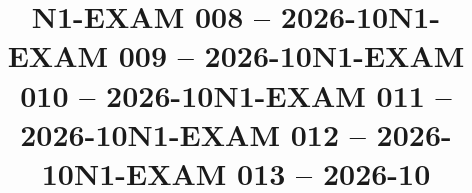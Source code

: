 \documentclass{ip-exam}
\begin{document}







\cleartoeven
\setcounter{questioncounter}{0}
\setcounter{page}{1}
\title{N1-EXAM 008 -- 2026-10}
\makeexamheader








\cleartoeven
\setcounter{questioncounter}{0}
\setcounter{page}{1}
\title{N1-EXAM 009 -- 2026-10}
\makeexamheader








\cleartoeven
\setcounter{questioncounter}{0}
\setcounter{page}{1}
\title{N1-EXAM 010 -- 2026-10}
\makeexamheader








\cleartoeven
\setcounter{questioncounter}{0}
\setcounter{page}{1}
\title{N1-EXAM 011 -- 2026-10}
\makeexamheader








\cleartoeven
\setcounter{questioncounter}{0}
\setcounter{page}{1}
\title{N1-EXAM 012 -- 2026-10}
\makeexamheader








\cleartoeven
\setcounter{questioncounter}{0}
\setcounter{page}{1}
\title{N1-EXAM 013 -- 2026-10}
\makeexamheader
\end{document}
